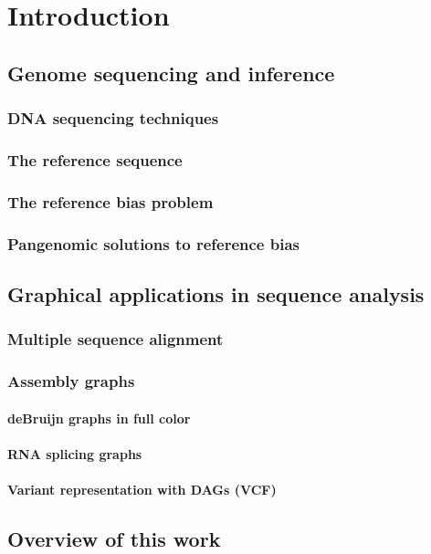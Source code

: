 
\chapter{Introduction}  %

\ifpdf
    \graphicspath{{Chapter1/Figs/Raster/}{Chapter1/Figs/PDF/}{Chapter1/Figs/}}
\else
    \graphicspath{{Chapter1/Figs/Vector/}{Chapter1/Figs/}}
\fi


\section{Genome sequencing and inference}

\subsection{DNA sequencing techniques}

\subsection{The reference sequence}

\subsection{The reference bias problem}

\subsection{Pangenomic solutions to reference bias}

\section{Graphical applications in sequence analysis}

\subsection{Multiple sequence alignment}

\subsection{Assembly graphs}

\subsubsection{deBruijn graphs in full color}

\subsubsection{RNA splicing graphs}

\subsubsection{Variant representation with DAGs (VCF)}

\section{Overview of this work}

